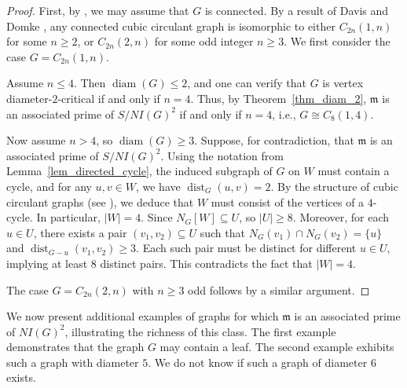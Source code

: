 \documentclass[12pt,reqno,twoside]{amsart}
\newcommand{\mm}{\mathfrak m}
\DeclareMathOperator{\diam}{diam}
\DeclareMathOperator{\dist}{dist}
\theoremstyle{definition}
\theoremstyle{plain}
\theoremstyle{remark}
\numberwithin{equation}{section}
\begin{document}
\begin{proof}
First, by \cite[Theorem 1.1]{NV}, we may assume that $G$ is connected. By a result of Davis and Domke \cite{DD}, any connected cubic circulant graph is isomorphic to either $C_{2n}(1,n)$ for some $n \geq 2$, or $C_{2n}(2,n)$ for some odd integer $n \geq 3$. We first consider the case $G = C_{2n}(1,n)$.

Assume $n \leq 4$. Then $\diam(G) \leq 2$, and one can verify that $G$ is vertex diameter-$2$-critical if and only if $n = 4$. Thus, by Theorem~\ref{thm_diam_2}, $\mm$ is an associated prime of $S/NI(G)^2$ if and only if $n = 4$, i.e., $G \cong C_8(1,4)$.

Now assume $n > 4$, so $\diam(G) \geq 3$. Suppose, for contradiction, that $\mm$ is an associated prime of $S/NI(G)^2$. Using the notation from Lemma~\ref{lem_directed_cycle}, the induced subgraph of $G$ on $W$ must contain a cycle, and for any $u, v \in W$, we have $\dist_G(u, v) = 2$. By the structure of cubic circulant graphs (see \cite[Lemma 2.5]{HPV}), we deduce that $W$ must consist of the vertices of a $4$-cycle. In particular, $|W| = 4$. Since $N_G[W] \subseteq U$, so $|U| \geq 8$. Moreover, for each $u \in U$, there exists a pair $(v_1, v_2) \subseteq U$ such that $N_G(v_1) \cap N_G(v_2) = \{u\}$ and $\dist_{G - u}(v_1, v_2) \geq 3$. Each such pair must be distinct for different $u \in U$, implying at least $8$ distinct pairs. This contradicts the fact that $|W| = 4$.

The case $G = C_{2n}(2,n)$ with $n \geq 3$ odd follows by a similar argument.
\end{proof}

We now present additional examples of graphs for which $\mm$ is an associated prime of $NI(G)^2$, illustrating the richness of this class. The first example demonstrates that the graph $G$ may contain a leaf. The second example exhibits such a graph with diameter $5$. We do not know if such a graph of diameter $6$ exists.
\end{document}
